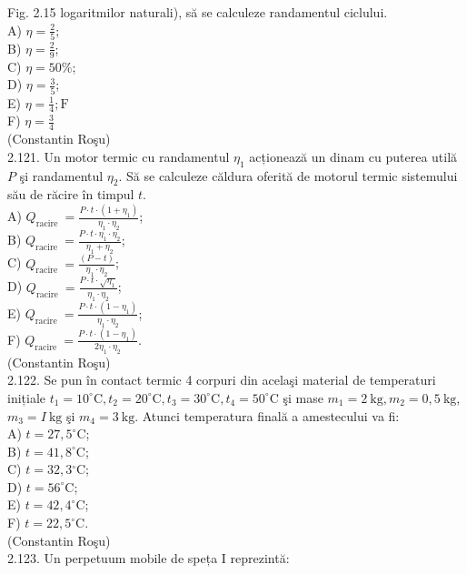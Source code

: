 \documentclass[10pt]{article}
\begin{document}
Fig. 2.15 logaritmilor naturali), să se calculeze randamentul ciclului.\\
A) $\eta=\frac{2}{5} ;$\\
B) $\eta=\frac{2}{9}$;\\
C) $\eta=50 \%$;\\
D) $\eta=\frac{3}{5}$;\\
E) $\eta=\frac{1}{4} ; \mathrm{F}$\\
F) $\eta=\frac{3}{4}$\\
(Constantin Roşu)\\
2.121. Un motor termic cu randamentul $\eta_{1}$ acționează un dinam cu puterea utilă $P$ şi randamentul $\eta_{2}$. Să se calculeze căldura oferită de motorul termic sistemului său de răcire în timpul $t$.\\
A) $Q_{\text {racire }}=\frac{P \cdot t \cdot\left(1+\eta_{1}\right)}{\eta_{1} \cdot \eta_{2}}$;\\
B) $Q_{\text {racire }}=\frac{P \cdot t \cdot \eta_{1} \cdot \eta_{2}}{\eta_{1}+\eta_{2}}$;\\
C) $Q_{\text {racire }}=\frac{(P-t)}{\eta_{1} \cdot \eta_{2}}$;\\
D) $Q_{\text {racire }}=\frac{P \cdot t \cdot \sqrt{\eta_{1}}}{\eta_{1} \cdot \eta_{2}}$;\\
E) $Q_{\text {racire }}=\frac{P \cdot t \cdot\left(1-\eta_{1}\right)}{\eta_{1} \cdot \eta_{2}}$;\\
F) $Q_{\text {racire }}=\frac{P \cdot t \cdot\left(1-\eta_{1}\right)}{2 \eta_{1} \cdot \eta_{2}}$.\\
(Constantin Roşu)\\
2.122. Se pun în contact termic 4 corpuri din acelaşi material de temperaturi inițiale $t_{1}=10^{\circ} \mathrm{C}, t_{2}=20^{\circ} \mathrm{C}, t_{3}=30^{\circ} \mathrm{C}, t_{4}=50^{\circ} \mathrm{C}$ şi mase $m_{1}=2 \mathrm{~kg}, m_{2}=0,5 \mathrm{~kg}$, $m_{3}=I \mathrm{~kg}$ şi $m_{4}=3 \mathrm{~kg}$. Atunci temperatura finală a amestecului va fi:\\
A) $t=27,5^{\circ} \mathrm{C}$;\\
B) $t=41,8^{\circ} \mathrm{C}$;\\
C) $t=32,3{ }^{\circ} \mathrm{C}$;\\
D) $t=56^{\circ} \mathrm{C}$;\\
E) $t=42,4^{\circ} \mathrm{C}$;\\
F) $t=22,5^{\circ} \mathrm{C}$.\\
(Constantin Roşu)\\
2.123. Un perpetuum mobile de speța I reprezintă:\\
\end{document}
